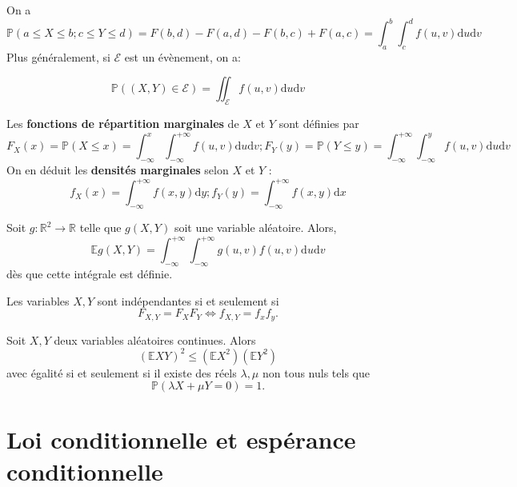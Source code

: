 \documentclass[]{book}
\theoremstyle{definition}
\theoremstyle{definition}
\theoremstyle{definition}
\theoremstyle{remark}
\let\BeginKnitrBlock\begin \let\EndKnitrBlock\end
\begin{document}
\BeginKnitrBlock{lemma}
\protect\hypertarget{lem:unnamed-chunk-54}{}{\label{lem:unnamed-chunk-54} }On a
\[
  \mathbb{P}(a \leq X \leq b ; c \leq Y \leq d) = F(b,d) - F(a,d) - F(b,c)+F(a,c)
  = \int_{a}^b \int_{c}^d f(u,v) \mbox{d}u \mbox{d}v
\]
Plus généralement, si \(\mathcal{E}\) est un évènement, on a:

\[
  \mathbb{P}\left( (X,Y) \in \mathcal{E} \right) = \iint_{\mathcal{E}} f(u,v) \mbox{d}u \mbox{d}v
  \]
\EndKnitrBlock{lemma}

\BeginKnitrBlock{definition}
\protect\hypertarget{def:unnamed-chunk-55}{}{\label{def:unnamed-chunk-55} }Les \textbf{fonctions de répartition marginales} de \(X\) et \(Y\) sont définies par
\[
  F_X(x) = \mathbb{P}(X  \leq x) = \int_{-\infty}^x \int_{-\infty}^{+\infty} f(u,v) \mbox{d}u \mbox{d}v ; F_Y(y) = \mathbb{P}(Y  \leq y) = \int_{-\infty}^{+\infty} \int_{-\infty}^y  f(u,v) \mbox{d}u \mbox{d}v 
  \]
On en déduit les \textbf{densités marginales} selon \(X\) et \(Y\) :
\[
  f_X(x) = \int_{-\infty}^{+\infty} f(x,y) \mbox{d}y ; f_Y(y) = \int_{-\infty}^{+\infty} f(x,y) \mbox{d}x
  \]
\EndKnitrBlock{definition}

\BeginKnitrBlock{theorem}
\protect\hypertarget{thm:unnamed-chunk-56}{}{\label{thm:unnamed-chunk-56} }Soit \(g : \mathbb{R}^2 \to \mathbb{R}\) telle que \(g(X,Y)\) soit une variable aléatoire. Alors,
\[
  \mathbb{E} g(X,Y) = \int_{-\infty}^{+\infty} \int_{-\infty}^{+\infty} g(u,v) f(u,v) \mbox{d}u \mbox{d}v
  \] dès que cette intégrale est définie.
\EndKnitrBlock{theorem}

\BeginKnitrBlock{theorem}
\protect\hypertarget{thm:unnamed-chunk-57}{}{\label{thm:unnamed-chunk-57} }Les variables \(X,Y\) sont indépendantes si et seulement si
\[F_{X,Y} = F_X F_Y \iff f_{X,Y} = f_x f_y.\]
\EndKnitrBlock{theorem}

\BeginKnitrBlock{theorem}
\protect\hypertarget{thm:unnamed-chunk-58}{}{\label{thm:unnamed-chunk-58} }Soit \(X,Y\) deux variables aléatoires continues. Alors
\[\left( \mathbb{E}XY \right)^2 \leq \left( \mathbb{E} X^2\right) \left( \mathbb{E} Y^2\right)\]
avec égalité si et seulement si il existe des réels \(\lambda,\mu\) non tous nuls tels que
\[\mathbb{P}(\lambda X + \mu Y = 0) = 1.\]
\EndKnitrBlock{theorem}

\hypertarget{loi-conditionnelle-et-espuxe9rance-conditionnelle-1}{%
\section{Loi conditionnelle et espérance conditionnelle}\label{loi-conditionnelle-et-espuxe9rance-conditionnelle-1}}
\end{document}
